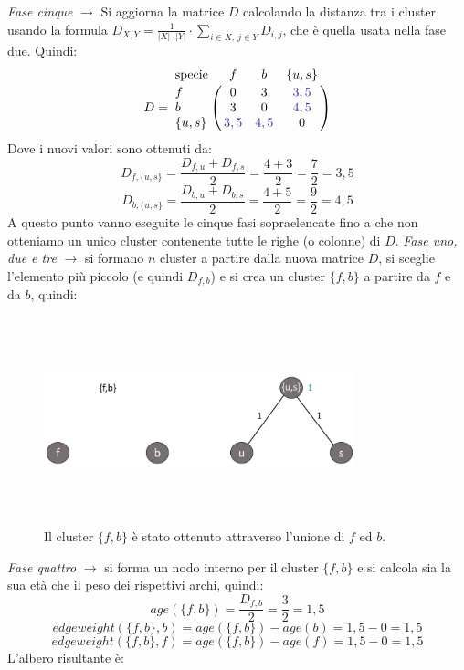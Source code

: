 \newline
\textit{Fase cinque} $\rightarrow$ Si aggiorna la matrice $D$ calcolando la distanza tra i cluster usando la formula $D_{X,Y}=\frac{1}{\left | X \right |\cdot \left | Y \right |} \cdot \sum_{i\in X,\: j\in Y}D_{i,j}$, che è quella usata nella fase due. Quindi:
\[
D = \bordermatrix{\text{specie}&f&b&\{u, s\}\cr
                f& 0 & 3 & {\color{Blue} 3,5}\cr
                b& 3 & 0 & {\color{Blue} 4,5}\cr
                \{u, s\}& {\color{Blue} 3,5} & {\color{Blue} 4,5} & 0}
\]
Dove i nuovi valori sono ottenuti da:
\[D_{f, \{u, s\}}=\frac{D_{f,u}+D_{f,s}}{2}=\frac{4+3}{2}=\frac{7}{2}=3,5\]
\[D_{b, \{u, s\}}=\frac{D_{b,u}+D_{b,s}}{2}=\frac{4+5}{2}=\frac{9}{2}=4,5\]
A questo punto vanno eseguite le cinque fasi sopraelencate fino a che non otteniamo un unico cluster contenente tutte le righe (o colonne) di $D$.
\newline
\textit{Fase uno, due e tre} $\rightarrow$  si formano $n$ cluster a partire dalla nuova matrice $D$, si sceglie l'elemento più piccolo (e quindi $D_{f, b}$) e si crea un cluster $\{f, b\}$ a partire da $f$ e da $b$, quindi:
\begin{figure}[h!]
\centering
	\includegraphics[height=6cm, width=9cm,keepaspectratio]{rooted_upgma_5.jpg}
 	\caption{Il cluster $\{f, b\}$ è stato ottenuto attraverso l'unione di $f$ ed $b$.}
  	\label{fig:rooted_upgma_5}
\end{figure}
\newline 
\textit{Fase quattro} $\rightarrow$ si forma un nodo interno per il cluster $\{f, b\}$ e si calcola sia la sua età che il peso dei rispettivi archi, quindi:
\[age(\{f, b\})=\frac{D_{f,b}}{2}=\frac{3}{2}=1,5\]
\[edgeweight(\{f, b\},b)=age(\{f, b\})-age(b)=1,5-0=1,5\]
\[edgeweight(\{f, b\},f)=age(\{f, b\})-age(f)=1,5-0=1,5\]
L'albero risultante è:
